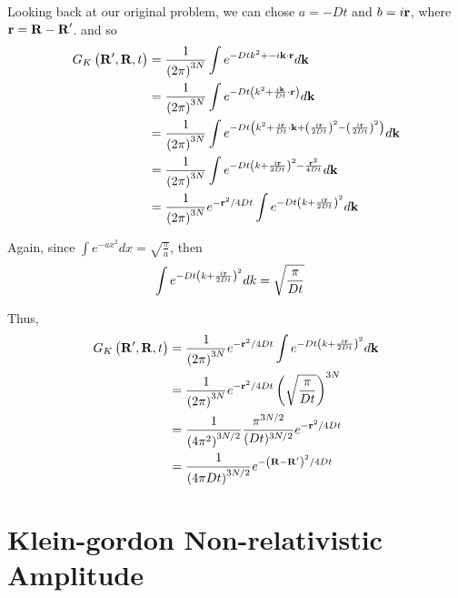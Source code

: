 Looking back at our original problem, we can chose $a = -Dt$ and $b = i \boldsymbol{\mathbf{r}}$, where $\boldsymbol{\mathbf{r}} = \boldsymbol{\mathbf{R}}-\boldsymbol{\mathbf{R}}^\prime$.
and so
\begin{align*}
G_K \left(\boldsymbol{\mathbf{R}}^\prime, \boldsymbol{\mathbf{R}}, t\right) &=
\frac{1}{\left(2\pi\right)^{3N}} \int e^{-Dtk^2 + -i\boldsymbol{\mathbf{k}}\cdot\boldsymbol{\mathbf{r}}} d\mathbf{k} \\
&= \frac{1}{\left(2\pi\right)^{3N}} \int e^{-Dt \left( k^2 + \frac{i\boldsymbol{\mathbf{k}}}{Dt}\cdot\boldsymbol{\mathbf{r}} \right)} d\mathbf{k} \\
&= \frac{1}{\left(2\pi\right)^{3N}} \int e^{-Dt \left( k^2 + \frac{i\boldsymbol{\mathbf{r}}}{Dt}\cdot\boldsymbol{\mathbf{k}} + \left(\frac{i\boldsymbol{\mathbf{r}}}{2Dt}\right)^2 - \left(\frac{i\boldsymbol{\mathbf{r}}}{2Dt}\right)^2 \right)} d\mathbf{k} \\
&= \frac{1}{\left(2\pi\right)^{3N}} \int e^{-Dt \left( k + \frac{i\boldsymbol{\mathbf{r}}}{2Dt}\right)^2 - \frac{ \boldsymbol{\mathbf{r}}^2 }{ 4Dt } } d\mathbf{k} \\
&= \frac{1}{\left(2\pi\right)^{3N}} e^{-\boldsymbol{\mathbf{r}}^2 /4Dt } \int e^{-Dt \left( k + \frac{i\boldsymbol{\mathbf{r}}}{2Dt}\right)^2 } d\mathbf{k} \\
\end{align*}

Again, since $\int e^{-ax^2} dx = \sqrt{ \frac{\pi}{a} }$,
then
\begin{align*}
\int e^{-Dt \left( k + \frac{i\boldsymbol{\mathbf{r}}}{2Dt}\right)^2 } dk &= \sqrt{ \frac{\pi}{Dt} }
\end{align*}

Thus,
\begin{align*}
G_K \left(\boldsymbol{\mathbf{R}}^\prime, \boldsymbol{\mathbf{R}}, t\right) &=
\frac{1}{\left(2\pi\right)^{3N}} e^{-\boldsymbol{\mathbf{r}}^2 /4Dt } \int e^{-Dt \left( k + \frac{i\boldsymbol{\mathbf{r}}}{2Dt}\right)^2 } d\mathbf{k} \\
&= \frac{1}{\left(2\pi\right)^{3N}} e^{-\boldsymbol{\mathbf{r}}^2 /4Dt } \left( \sqrt{ \frac{\pi}{Dt} } \right)^{3N} \\
&= \frac{1}{\left(4\pi^2\right)^{3N/2}} \frac{\pi^{3N/2}}{(Dt)^{3N/2}} e^{-\boldsymbol{\mathbf{r}}^2 /4Dt } \\
&= \frac{1}{\left(4\pi Dt\right)^{3N/2}} e^{-\left(\boldsymbol{\mathbf{R}} - \boldsymbol{\mathbf{R}}^\prime\right)^2 /4Dt }
\end{align*}




\section{Klein-gordon Non-relativistic Amplitude} \label{ps-kg:nonrelativistic-propagator}

